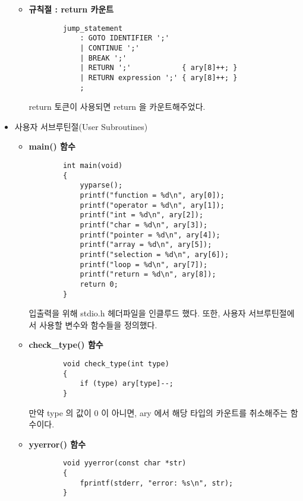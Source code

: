 \documentclass{article}
\begin{document}
\begin{itemize}
\begin{itemize}
		\item {\bf 규칙절 : return 카운트}
		\begin{lstlisting}
		jump_statement
			: GOTO IDENTIFIER ';'
			| CONTINUE ';'
			| BREAK ';'
			| RETURN ';'			{ ary[8]++; }
			| RETURN expression ';'	{ ary[8]++; }
			;
		\end{lstlisting}
		return 토큰이 사용되면 return 을 카운트해주었다.
	\end{itemize}

	\item 사용자 서브루틴절(User Subroutines)	
	\begin{itemize}
		\item {\bf main() 함수}
		\begin{lstlisting}
		int main(void)
		{
			yyparse();
			printf("function = %d\n", ary[0]);
			printf("operator = %d\n", ary[1]);
			printf("int = %d\n", ary[2]);
			printf("char = %d\n", ary[3]);
			printf("pointer = %d\n", ary[4]);
			printf("array = %d\n", ary[5]);
			printf("selection = %d\n", ary[6]);
			printf("loop = %d\n", ary[7]);
			printf("return = %d\n", ary[8]);
			return 0;
		}
		\end{lstlisting}
		입출력을 위해 stdio.h 헤더파일을 인클루드 했다.
		또한, 사용자 서브루틴절에서 사용할 변수와 함수들을 정의했다.
	
		\item {\bf check\_type() 함수}
		\begin{lstlisting}
		void check_type(int type)
		{
			if (type) ary[type]--;
		}
		\end{lstlisting}
		만약 type 의 값이 0 이 아니면, ary 에서 해당 타입의 카운트를 취소해주는 함수이다.
		
		\item {\bf yyerror() 함수}
		\begin{lstlisting}
		void yyerror(const char *str)
		{
			fprintf(stderr, "error: %s\n", str);
		}
		\end{lstlisting}
	\end{itemize}
\end{itemize}
\end{document}
